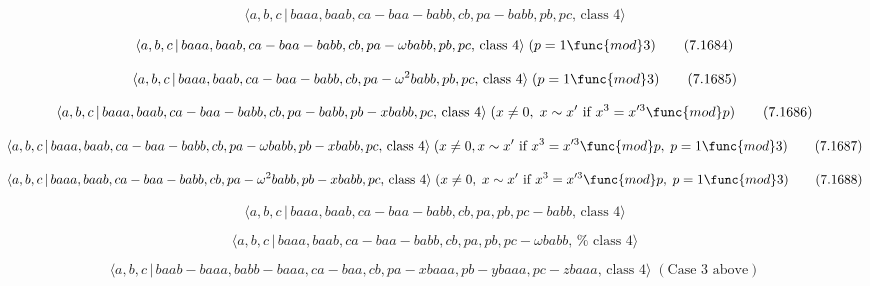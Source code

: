 \documentclass[10pt]{article}
\begin{document}
\begin{equation}
\langle a,b,c\,|\,baaa,baab,ca-baa-babb,cb,pa-babb,pb,pc,\,\text{class }%
4\rangle  \tag{7.1683}
\end{equation}

\begin{equation}
\langle a,b,c\,|\,baaa,baab,ca-baa-babb,cb,pa-\omega babb,pb,pc,\,\text{%
class }4\rangle \;(p=1\func{mod}3)  \tag{7.1684}
\end{equation}

\begin{equation}
\langle a,b,c\,|\,baaa,baab,ca-baa-babb,cb,pa-\omega ^{2}babb,pb,pc,\,\text{%
class }4\rangle \;(p=1\func{mod}3)  \tag{7.1685}
\end{equation}

\begin{equation}
\langle a,b,c\,|\,baaa,baab,ca-baa-babb,cb,pa-babb,pb-xbabb,pc,\,\text{class 
}4\rangle \;(x\neq 0,\;x\sim x^{\prime }\text{ if }x^{3}=x^{\prime 3}\func{%
mod}p)  \tag{7.1686}
\end{equation}

\begin{equation}
\langle a,b,c\,|\,baaa,baab,ca-baa-babb,cb,pa-\omega babb,pb-xbabb,pc,\,%
\text{class }4\rangle \;(x\neq 0,x \sim x^{\prime }\text{ if }x^3=x^{\prime
3}\func{mod}p,\;p=1\func{mod}3)  \tag{7.1687}
\end{equation}

\begin{equation}
\langle a,b,c\,|\,baaa,baab,ca-baa-babb,cb,pa-\omega ^{2}babb,pb-xbabb,pc,\,%
\text{class }4\rangle \;(x\neq 0,\;x\sim x^{\prime }\text{ if }%
x^{3}=x^{\prime 3}\func{mod}p,\;p=1\func{mod}3)  \tag{7.1688}
\end{equation}

\begin{equation}
\langle a,b,c\,|\,baaa,baab,ca-baa-babb,cb,pa,pb,pc-babb,\,\text{class }%
4\rangle  \tag{7.1689}
\end{equation}

\begin{equation}
\langle a,b,c\,|\,baaa,baab,ca-baa-babb,cb,pa,pb,pc-\omega babb,\,\text{%
class }4\rangle  \tag{7.1690}
\end{equation}

\begin{equation}
\langle a,b,c\,|\,baab-baaa,babb-baaa,ca-baa,cb,pa-xbaaa,pb-ybaaa,pc-zbaaa,\,%
\text{class }4\rangle \;(\text{Case 3 above})  \tag{7.1691}
\end{equation}
\end{document}
